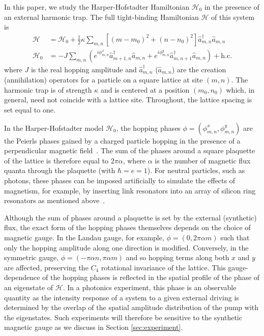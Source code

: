 In this paper, we study the Harper-Hofstadter Hamiltonian $\mathcal{H}_0$ in the presence of an external harmonic trap. The full tight-binding Hamiltonian $\mathcal{H}$ of this system is
%
\begin{align}
\mathcal{H} &= \mathcal{H}_0+\frac{1}{2}\kappa
\sum_{m,n}\left[(m-m_0)^{2}+(n-n_0)^{2}\right]\hat{a}_{m,n}^{\dagger}\hat{a}_{m,n} \label{eq:model}\\
\mathcal{H}_0 &= -J\sum_{m,n}(e^{i \phi_{m,n}^x}\hat{a}_{m+1,n}^{\dagger}\hat{a}_{m,n} 
+e^{i \phi_{m,n}^y}\hat{a}_{m,n+1}^{\dagger}\hat{a}_{m,n}) + \text{h.c.} \label{eq:hh_hamiltonian}
\end{align}
%
where $J$ is the real hopping amplitude and $\hat{a}_{m,n}^{\dagger}$ ($\hat{a}_{m,n}$) are the creation (annihilation) operators for a particle on a square lattice at site $(m,n)$. The harmonic trap is of strength $\kappa$ and is centered at a position $(m_0, n_0)$ which, in general, need not coincide with a lattice site. Throughout, the lattice spacing is set equal to one. 

In the Harper-Hofstadter model $\mathcal{H}_0$, the hopping phases $\phi = (\phi_{m,n}^x, \phi_{m,n}^y)$ are the Peierls phases gained by a charged particle hopping in the presence of a perpendicular magnetic field~\cite{harper1955magnetic,hofstadter1976butterfly}. The sum of the phases around a square plaquette of the lattice is therefore equal to $2\pi\alpha$, where $\alpha$ is the number of magnetic flux quanta through the plaquette (with $\hbar=e=1$). For neutral particles, such as photons, these phases can be imposed artificially to simulate the effects of magnetism, for example, by inserting link resonators into an array of silicon ring resonators as mentioned above~\cite{hafezi2013imaging}. 

Although the sum of phases around a plaquette is set by the external (synthetic) flux, the exact form of the hopping phases themselves depends on the choice of magnetic gauge. In the Landau gauge, for example, $\phi = (0, 2\pi\alpha m)$ such that only the hopping amplitude along one direction is modified. Conversely, in the symmetric gauge, $\phi = (-\pi\alpha n, \pi\alpha m)$ and so hopping terms along both $x$ and $y$ are affected, preserving the $C_4$ rotational invariance of the lattice. This gauge-dependence of the hopping phases is reflected in the spatial profile of the phase of an eigenstate of $\mathcal{H}$. In a photonics experiment, this phase is an observable quantity as the intensity response of a system to a given external driving is determined by the overlap of the spatial amplitude distribution of the pump with the eigenstates. Such experiments will therefore be sensitive to the synthetic magnetic gauge as we discuss in Section \ref{sec:experiment}.

